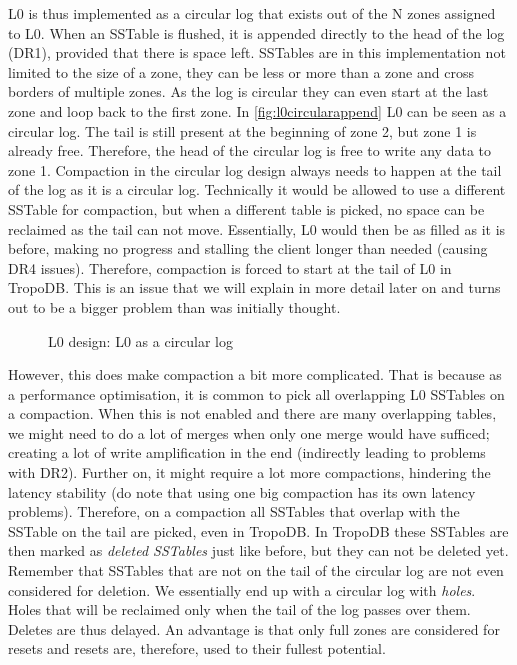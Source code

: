 L0 is thus implemented as a circular log that exists out of the N zones assigned to L0.  When an SSTable is flushed, it is appended directly to the head of the log (DR1), provided that there is space left. SSTables are in this implementation not limited to the size of a zone, they can be less or more than a zone and cross borders of multiple zones. As the log is circular they can even start at the last zone and loop back to the first zone. In \autoref{fig:l0circularappend} L0 can be seen as a circular log. The tail is still present at the beginning of zone 2, but zone 1 is already free. Therefore, the head of the circular log is free to write any data to zone 1. Compaction in the circular log design always needs to happen at the tail of the log as it is a circular log. Technically it would be allowed to use a different SSTable for compaction, but when a different table is picked, no space can be reclaimed as the tail can not move. Essentially, L0 would then be as filled as it is before, making no progress and stalling the client longer than needed (causing DR4 issues). Therefore, compaction is forced to start at the tail of L0 in TropoDB. This is an issue that we will explain in more detail later on and turns out to be a bigger problem than was initially thought.

\begin{figure}[h]
\centering
\begin{minipage}{0.75\textwidth}
  \centering
  
\end{minipage}%
\caption{ L0 design: L0 as a circular log }
\label{fig:l0circularappend}
\end{figure}

However, this does make compaction a bit more complicated. That is because as a performance optimisation, it is common to pick all overlapping L0 SSTables on a compaction. When this is not enabled and there are many overlapping tables, we might need to do a lot of merges when only one merge would have sufficed; creating a lot of write amplification in the end (indirectly leading to problems with DR2). Further on, it might require a lot more compactions, hindering the latency stability (do note that using one big compaction has its own latency problems). Therefore, on a compaction all SSTables that overlap with the SSTable on the tail are picked, even in TropoDB. In TropoDB these SSTables are then marked as \textit{deleted SSTables} just like before, but they can not be deleted yet. Remember that SSTables that are not on the tail of the circular log are not even considered for deletion. We essentially end up with a circular log with \textit{holes}. Holes that will be reclaimed only when the tail of the log passes over them. Deletes are thus delayed. An advantage is that only full zones are considered for resets and resets are, therefore, used to their fullest potential.

